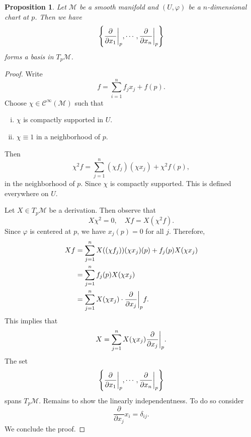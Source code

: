 \documentclass[8pt]{article}
\newtheorem{proposition}{Proposition}[section]
\newcommand{\M}[0]{\mathcal{M}}
\newcommand{\cinf}[0]{\mathcal{C}^\infty}
\begin{document}
\begin{proposition}
  Let $\M$ be a smooth manifold and $(U,\varphi)$ be a $n$-dimensional chart at $p$. Then we have 
  \begin{equation*}
    \left\{{\frac {\partial} {\partial x_1}}\bigg{|}_p,\cdots,{\frac {\partial} {\partial x_n}}\bigg{|}_p\right\}
  \end{equation*}
  forms a basis in $T_p\M$.
\end{proposition}
\begin{proof}
  Write 
  \begin{equation*}
    f = \sum_{i=1}^n f_jx_j+f(p).
  \end{equation*}
  Choose $\chi\in\cinf(\M)$ such that 
  \begin{enumerate}[i).]
    \item $\chi$ is compactly supported in $U$.
    \item $\chi\equiv1$ in a neighborhood of $p$.
  \end{enumerate}
  Then 
  \begin{equation*}
    \chi^2 f = \sum_{j=1}^n (\chi f_j)(\chi x_j)+\chi^2f(p),
  \end{equation*}
  in the neighborhood of $p$. Since $\chi$ is compactly supported. This is defined everywhere on $U$. 
  \par Let $X\in T_p\M$ be a derivation. Then observe that 
  \begin{equation*}
    X\chi^2 = 0,\quad Xf = X(\chi^2f).
  \end{equation*}
  Since $\varphi$ is centered at $p$, we have $x_j(p)=0$ for all $j$. Therefore, 
  \begin{align*}
    Xf &= \sum_{j=1}^n X((\chi f_j))(\chi x_j)(p)+f_j(p)X(\chi x_j)\\
    &= \sum_{j=1}^n f_j(p)X(\chi x_j)\\
    & = \sum_{j=1}^nX(\chi x_j)\cdot{\frac {\partial} {\partial x_j}}\bigg{|}_pf.\\
  \end{align*}
  This implies that 
  \begin{equation*}
    X = \sum_{j=1}^n X(\chi x_j){\frac {\partial } {\partial x_j}}\bigg{|}_p.
  \end{equation*}
  The set 
  \begin{equation*}
    \left\{{\frac {\partial} {\partial x_1}}\bigg{|}_p,\cdots,{\frac {\partial} {\partial x_n}}\bigg{|}_p\right\}
  \end{equation*}
  spans $T_p\M$. Remains to show the linearly independentness. To do so consider 
  \begin{equation*}
    {\frac {\partial} {\partial x_j}}x_i = \delta_{ij}.
  \end{equation*}
  We conclude the proof.
\end{proof}
\end{document}
